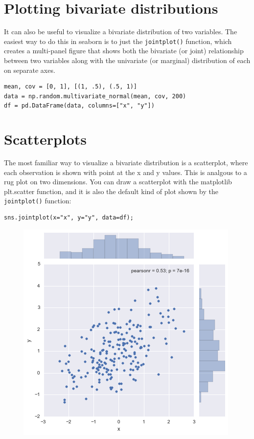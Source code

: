 \documentclass{beamer}
\begin{document}
\section{Plotting bivariate distributions}
\begin{frame}[fragile]
It can also be useful to visualize a bivariate distribution of two variables. The easiest way to do this in seaborn is to just the \texttt{jointplot()} function, which creates a multi-panel figure that shows both the bivariate (or joint) relationship between two variables along with the univariate (or marginal) distribution of each on separate axes.
\begin{verbatim}
mean, cov = [0, 1], [(1, .5), (.5, 1)]
data = np.random.multivariate_normal(mean, cov, 200)
df = pd.DataFrame(data, columns=["x", "y"])
\end{verbatim}

\end{frame}
\section{Scatterplots}
\begin{frame}[fragile]
The most familiar way to visualize a bivariate distribution is a scatterplot, where each observation is shown with point at the x and y values. This is analgous to a rug plot on two dimensions. You can draw a scatterplot with the matplotlib plt.scatter function, and it is also the default kind of plot shown by the \texttt{jointplot()} function:
\begin{verbatim}
sns.jointplot(x="x", y="y", data=df);
\end{verbatim}
\begin{figure}
\centering
\includegraphics[width=0.7\linewidth]{images/distributions_30_0}
\end{figure}

\end{frame}
\end{document}
